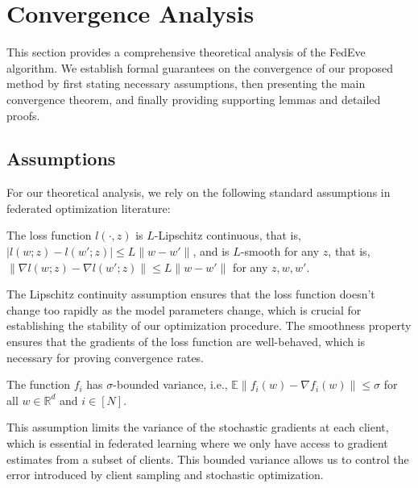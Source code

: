 \newpage

\section{Convergence Analysis}
This section provides a comprehensive theoretical analysis of the FedEve algorithm. We establish formal guarantees on the convergence of our proposed method by first stating necessary assumptions, then presenting the main convergence theorem, and finally providing supporting lemmas and detailed proofs.

\subsection{Assumptions}
For our theoretical analysis, we rely on the following standard assumptions in federated optimization literature:

\begin{assumption}  \label{cassump_Lip-continuous}
    The loss function \(l(\cdot, z)\) is \(L\)-Lipschitz continuous, that is,
    \(|l(w; z) - l(w'; z) | \le L \| w - w' \|\), and is \(L\)-smooth for any \(z\), that is, 
    \(\| \nabla l(w; z) - \nabla l(w';z) \| \le L \| w - w' \|\)
    for any \(z, w, w'\).
\end{assumption}

The Lipschitz continuity assumption ensures that the loss function doesn't change too rapidly as the model parameters change, which is crucial for establishing the stability of our optimization procedure. The smoothness property ensures that the gradients of the loss function are well-behaved, which is necessary for proving convergence rates.

\begin{assumption}
    The function \(f_i\) has \(\sigma\)-bounded variance, i.e., 
    \(\mathbb{E}\|f_i(w) - \nabla f_i(w)\| \leq \sigma\) for all \(w \in \mathbb{R}^d\) and \(i \in [N]\).
    \label{casp:variance}
\end{assumption}

This assumption limits the variance of the stochastic gradients at each client, which is essential in federated learning where we only have access to gradient estimates from a subset of clients. This bounded variance allows us to control the error introduced by client sampling and stochastic optimization.


